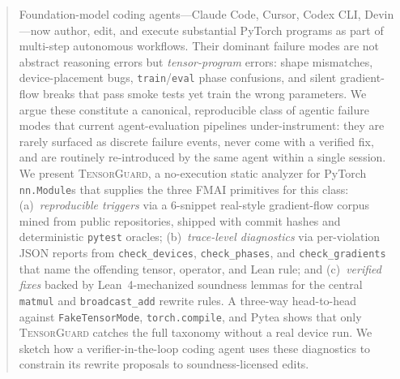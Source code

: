 \documentclass{article}
\begin{document}

\printAffiliationsAndNotice{}

\begin{abstract}
Foundation-model coding agents---Claude Code, Cursor, Codex CLI, Devin---now
author, edit, and execute substantial PyTorch programs as part of multi-step
autonomous workflows. Their dominant failure modes are not abstract reasoning
errors but \emph{tensor-program} errors: shape mismatches, device-placement
bugs, \texttt{train}/\texttt{eval} phase confusions, and silent
gradient-flow breaks that pass smoke tests yet train the wrong parameters.
We argue these constitute a canonical, reproducible class of agentic failure
modes that current agent-evaluation pipelines under-instrument: they are
rarely surfaced as discrete failure events, never come with a verified fix,
and are routinely re-introduced by the same agent within a single session.
We present \textsc{TensorGuard}, a no-execution static analyzer for PyTorch
\texttt{nn.Module}s that supplies the three FMAI primitives for this class:
(a)~\emph{reproducible triggers} via a 6-snippet real-style gradient-flow
corpus mined from public repositories, shipped with commit hashes and
deterministic \texttt{pytest} oracles; (b)~\emph{trace-level diagnostics}
via per-violation JSON reports from \texttt{check\_devices},
\texttt{check\_phases}, and \texttt{check\_gradients} that name the
offending tensor, operator, and Lean rule; and (c)~\emph{verified fixes}
backed by Lean~4-mechanized soundness lemmas for the central
\texttt{matmul} and \texttt{broadcast\_add} rewrite rules. A three-way
head-to-head against \texttt{FakeTensorMode}, \texttt{torch.compile}, and
Pytea shows that only \textsc{TensorGuard} catches the full taxonomy
without a real device run. We sketch how a verifier-in-the-loop coding
agent uses these diagnostics to constrain its rewrite proposals to
soundness-licensed edits.
\end{abstract}
\end{document}
